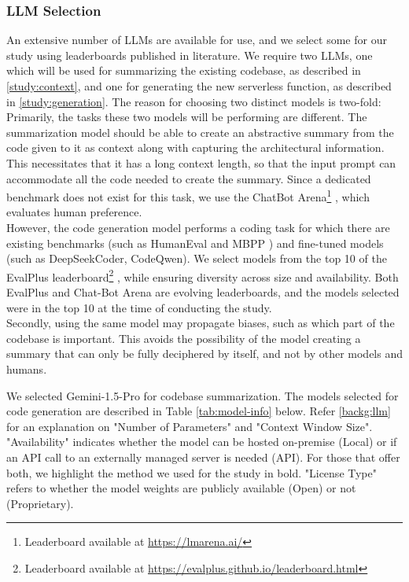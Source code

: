 \subsubsection{LLM Selection} \label{study:llm-selection}
An extensive number of LLMs are available for use, and we select some for our study using leaderboards published in literature. We require two LLMs, one which will be used for summarizing the existing codebase, as described in \ref{study:context}, and one for generating the new serverless function, as described in \ref{study:generation}. The reason for choosing two distinct models is two-fold: \\
    Primarily, the tasks these two models will be performing are different. The summarization model should be able to create an abstractive summary from the code given to it as context along with capturing the architectural information. This necessitates that it has a long context length, so that the input prompt can accommodate all the code needed to create the summary. Since a dedicated benchmark does not exist for this task, we use the ChatBot Arena\footnote{Leaderboard available at \url{https://lmarena.ai/}} \cite{chiang2024chatbotarenaopenplatform}, which evaluates human preference. \\ 
    However, the code generation model performs a coding task for which there are existing benchmarks (such as HumanEval \cite{chen2021evaluating} and MBPP \cite{austin2021mbpp}) and fine-tuned models (such as DeepSeekCoder, CodeQwen). We select models from the top 10 of the EvalPlus leaderboard\footnote{Leaderboard available at \url{https://evalplus.github.io/leaderboard.html}} \cite{liu2024code_evalplus}, while ensuring diversity across size and availability. Both EvalPlus and Chat-Bot Arena are evolving leaderboards, and the models selected were in the top 10 at the time of conducting the study.   \\
    Secondly, using the same model may propagate biases, such as which part of the codebase is important. This avoids the possibility of the model creating a summary that can only be fully deciphered by itself, and not by other models and humans.

We selected Gemini-1.5-Pro\cite{team2024gemini} for codebase summarization.
The models selected for code generation are described in Table \ref{tab:model-info} below. Refer \ref{backg:llm} for an explanation on "Number of Parameters" and "Context Window Size". "Availability" indicates whether the model can be hosted on-premise (Local) or if an API call to an externally managed server is needed (API). For those that offer both, we highlight the method we used for the study in bold. "License Type" refers to whether the model weights are publicly available (Open) or not (Proprietary). 


